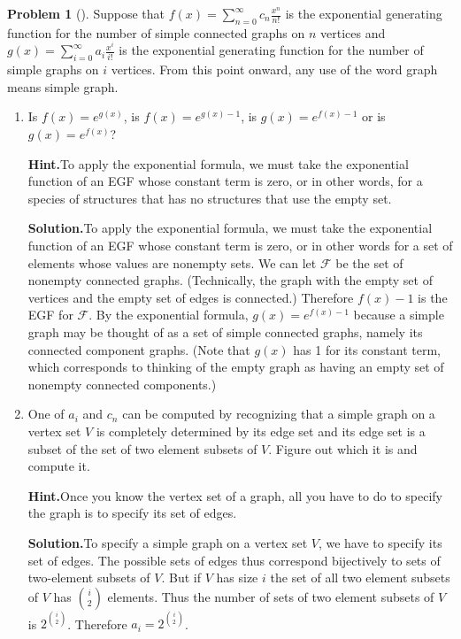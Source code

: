 \documentclass[10pt,]{book}
\theoremstyle{plain}
\theoremstyle{definition}
\newtheorem{activity}[project]{Problem}
\theoremstyle{definition}
\numberwithin{equation}{chapter}
\newcommand{\F}{\mathcal{F}}
\begin{document}
\begin{activity}[]\label{activity-421}
Suppose that \(f(x) = \sum_{n=0}^\infty c_n \frac{x^n}{n!}\) is the exponential generating function for the number of simple connected graphs on \(n\) vertices and \(g(x) = \sum_{i=0}^\infty a_i \frac{x^i}{i!}\) is the exponential generating function for the number of simple graphs on \(i\) vertices. From this point onward, any use of the word graph means simple graph.%
\begin{enumerate}[font=\bfseries,label=(\alph*),ref=\alph*]
\item\label{task-264} Is \(f(x) = e^{g(x)}\), is \(f(x) = e^{g(x)-1}\), is \(g(x) = e^{f(x)-1}\) or is \(g(x) = e^{f(x)}\)?%
\par\medskip\noindent%
\textbf{Hint.}\quad To apply the exponential formula, we must take the exponential function of an EGF whose constant term is zero, or in other words, for a species of structures that has no structures that use the empty set.%
\par\medskip\noindent%
\textbf{Solution.}\quad To apply the exponential formula, we must take the exponential function of an EGF whose constant term is zero, or in other words for a set of elements whose values are nonempty sets. We can let \(\F\) be the set of nonempty connected graphs. (Technically, the graph with the empty set of vertices and the empty set of edges is connected.) Therefore \(f(x) -1\) is the EGF for \(\F\). By the exponential formula, \(g(x)=e^{f(x)-1}\) because a simple graph may be thought of as a set of simple connected graphs, namely its connected component graphs. (Note that \(g(x)\) has 1 for its constant term, which corresponds to thinking of the empty graph as having an empty set of nonempty connected components.)%
\item\label{task-265} One of \(a_i\) and \(c_n\) can be computed by recognizing that a simple graph on a vertex set \(V\) is completely determined by its edge set and its edge set is a subset of the set of two element subsets of \(V\). Figure out which it is and compute it.%
\par\medskip\noindent%
\textbf{Hint.}\quad Once you know the vertex set of a graph, all you have to do to specify the graph is to specify its set of edges.%
\par\medskip\noindent%
\textbf{Solution.}\quad To specify a simple graph on a vertex set \(V\), we have to specify its set of edges. The possible sets of edges thus correspond bijectively to sets of two-element subsets of \(V\). But if \(V\) has size \(i\) the set of all two element subsets of \(V\) has \(\binom{i}{2}\) elements. Thus the number of sets of two element subsets of \(V\) is \(2^{\binom{i}{2}}\). Therefore \(a_i = 2^{\binom{i}{2}}\).%

\end{enumerate}
\end{activity}
\end{document}
